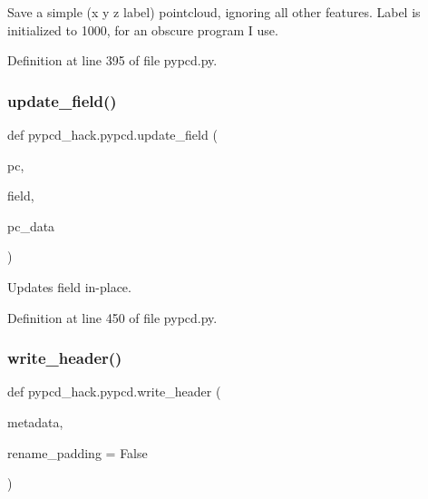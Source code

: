 \begin{DoxyVerb}Save a simple (x y z label) pointcloud, ignoring all other features.
Label is initialized to 1000, for an obscure program I use.
\end{DoxyVerb}
 

Definition at line 395 of file pypcd.\+py.

\mbox{\label{namespacepypcd__hack_1_1pypcd_a4b83dab7c0e2a8c67bbddd45e2fe2ff2}} 
\subsubsection{\texorpdfstring{update\+\_\+field()}{update\_field()}}
{\footnotesize\ttfamily def pypcd\+\_\+hack.\+pypcd.\+update\+\_\+field (\begin{DoxyParamCaption}\item[{}]{pc,  }\item[{}]{field,  }\item[{}]{pc\+\_\+data }\end{DoxyParamCaption})}

\begin{DoxyVerb}Updates field in-place.
\end{DoxyVerb}
 

Definition at line 450 of file pypcd.\+py.

\mbox{\label{namespacepypcd__hack_1_1pypcd_adad732652b44e6880384410d0ef282ae}} 
\subsubsection{\texorpdfstring{write\+\_\+header()}{write\_header()}}
{\footnotesize\ttfamily def pypcd\+\_\+hack.\+pypcd.\+write\+\_\+header (\begin{DoxyParamCaption}\item[{}]{metadata,  }\item[{}]{rename\+\_\+padding = {\ttfamily False} }\end{DoxyParamCaption})}


